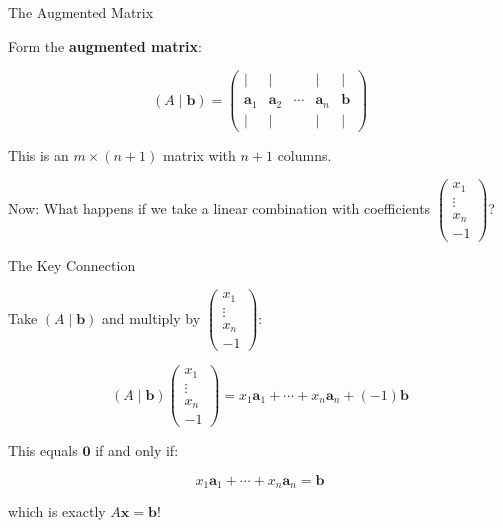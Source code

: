 \documentclass[10pt]{beamer}
\theoremstyle{definition}
\newcommand{\x}[1]{\alert{\textbf{#1}}}
\begin{document}
\begin{frame}{The Augmented Matrix}

Form the \x{augmented matrix}:

$$(A \mid \mathbf{b}) = \begin{pmatrix} | & | & & | & | \\ \mathbf{a}_1 & \mathbf{a}_2 & \cdots & \mathbf{a}_n & \mathbf{b} \\ | & | & & | & | \end{pmatrix}$$

\vspace{1em}

This is an $m \times (n+1)$ matrix with $n+1$ columns.

\vspace{1em}

Now: What happens if we take a linear combination with coefficients $\begin{pmatrix} x_1 \\ \vdots \\ x_n \\ -1 \end{pmatrix}$?

\end{frame}

\begin{frame}{The Key Connection}

Take $(A \mid \mathbf{b})$ and multiply by $\begin{pmatrix} x_1 \\ \vdots \\ x_n \\ -1 \end{pmatrix}$:

\vspace{0.5em}

$$(A \mid \mathbf{b}) \begin{pmatrix} x_1 \\ \vdots \\ x_n \\ -1 \end{pmatrix} = x_1\mathbf{a}_1 + \cdots + x_n\mathbf{a}_n + (-1)\mathbf{b}$$

\vspace{0.5em}

This equals $\mathbf{0}$ if and only if:

$$x_1\mathbf{a}_1 + \cdots + x_n\mathbf{a}_n = \mathbf{b}$$

which is exactly $A\mathbf{x} = \mathbf{b}$!

\end{frame}
\end{document}
